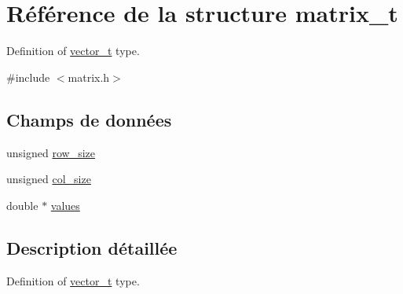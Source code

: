 \hypertarget{structmatrix__t}{\section{Référence de la structure matrix\-\_\-t}
\label{structmatrix__t}
}


Definition of \hyperlink{structvector__t}{vector\-\_\-t} type.  




{\ttfamily \#include $<$matrix.\-h$>$}

\subsection*{Champs de données}
\begin{DoxyCompactItemize}
\item 
unsigned \hyperlink{structmatrix__t_ad8db0f75faea2e9fb4e0423ca72bb740}{row\-\_\-size}
\item 
unsigned \hyperlink{structmatrix__t_a8927ebbe25fb67a44d54685a2af15de1}{col\-\_\-size}
\item 
double $\ast$ \hyperlink{structmatrix__t_adc159eec6e4a7f7e6a76363cfd1e62fe}{values}
\end{DoxyCompactItemize}


\subsection{Description détaillée}
Definition of \hyperlink{structvector__t}{vector\-\_\-t} type. 

